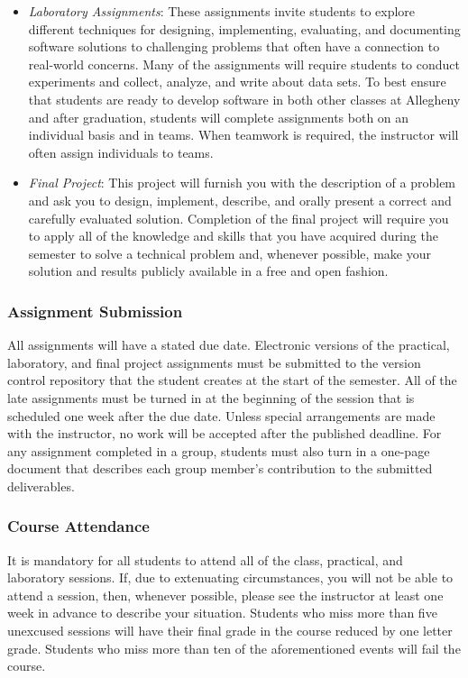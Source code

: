 \documentclass[11pt]{article}
\begin{document}
\begin{itemize}
  \item {\em Laboratory Assignments\/}: These assignments invite students to explore different techniques for designing,
    implementing, evaluating, and documenting software solutions to challenging problems that often have a connection to
    real-world concerns. Many of the assignments will require students to conduct experiments and collect, analyze, and
    write about data sets. To best ensure that students are ready to develop software in both other classes at Allegheny
    and after graduation, students will complete assignments both on an individual basis and in teams. When teamwork is
    required, the instructor will often assign individuals to teams.

  \item {\em Final Project\/}: This project will furnish you with the description of a problem and ask you to design,
    implement, describe, and orally present a correct and carefully evaluated solution. Completion of the final project
    will require you to apply all of the knowledge and skills that you have acquired during the semester to solve a
    technical problem and, whenever possible, make your solution and results publicly available in a free and open
    fashion.

\end{itemize}

\subsubsection*{Assignment Submission}

All assignments will have a stated due date. Electronic versions of the practical, laboratory, and final project
assignments must be submitted to the version control repository that the student creates at the start of the semester.
All of the late assignments must be turned in at the beginning of the session that is scheduled one week after the due
date. Unless special arrangements are made with the instructor, no work will be accepted after the published deadline.
For any assignment completed in a group, students must also turn in a one-page document that describes each group
member's contribution to the submitted deliverables.

\subsubsection*{Course Attendance}

It is mandatory for all students to attend all of the class, practical, and laboratory sessions. If, due to extenuating
circumstances, you will not be able to attend a session, then, whenever possible, please see the instructor at least one
week in advance to describe your situation.  Students who miss more than five unexcused sessions will have their final
grade in the course reduced by one letter grade. Students who miss more than ten of the aforementioned events will fail
the course.
\end{document}

